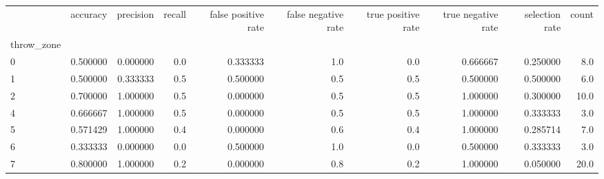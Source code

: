 \begin{tabular}{lrrrrrrrrr}
\toprule
{} &  accuracy &  precision &  recall &  false positive rate &  false negative rate &  true positive rate &  true negative rate &  selection rate &  count \\
throw\_zone &           &            &         &                      &                      &                     &                     &                 &        \\
\midrule
0          &  0.500000 &   0.000000 &     0.0 &             0.333333 &                  1.0 &                 0.0 &            0.666667 &        0.250000 &    8.0 \\
1          &  0.500000 &   0.333333 &     0.5 &             0.500000 &                  0.5 &                 0.5 &            0.500000 &        0.500000 &    6.0 \\
2          &  0.700000 &   1.000000 &     0.5 &             0.000000 &                  0.5 &                 0.5 &            1.000000 &        0.300000 &   10.0 \\
4          &  0.666667 &   1.000000 &     0.5 &             0.000000 &                  0.5 &                 0.5 &            1.000000 &        0.333333 &    3.0 \\
5          &  0.571429 &   1.000000 &     0.4 &             0.000000 &                  0.6 &                 0.4 &            1.000000 &        0.285714 &    7.0 \\
6          &  0.333333 &   0.000000 &     0.0 &             0.500000 &                  1.0 &                 0.0 &            0.500000 &        0.333333 &    3.0 \\
7          &  0.800000 &   1.000000 &     0.2 &             0.000000 &                  0.8 &                 0.2 &            1.000000 &        0.050000 &   20.0 \\
\bottomrule
\end{tabular}
